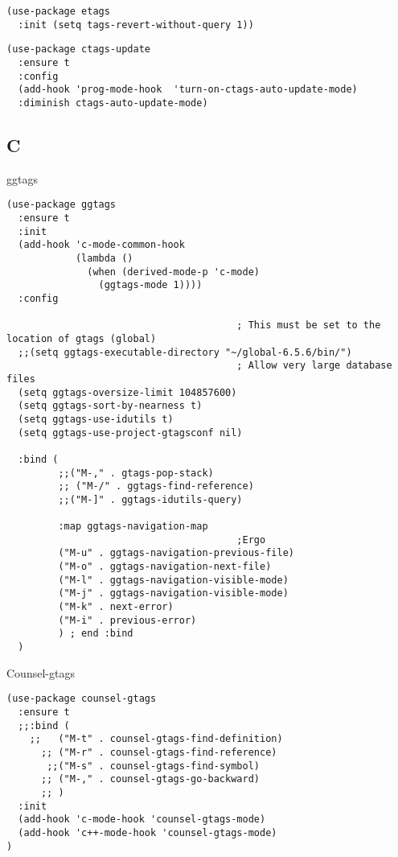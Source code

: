 \documentclass[12pt]{article}
\begin{document}
\lstset{language=example,label= ,caption= ,captionpos=b,numbers=none}
\begin{lstlisting}
(use-package etags
  :init (setq tags-revert-without-query 1))
\end{lstlisting}

\lstset{language=example,label= ,caption= ,captionpos=b,numbers=none}
\begin{lstlisting}
(use-package ctags-update
  :ensure t
  :config
  (add-hook 'prog-mode-hook  'turn-on-ctags-auto-update-mode)
  :diminish ctags-auto-update-mode)
\end{lstlisting}



\subsection{C}
\label{sec:orgb9423d5}
ggtags

\lstset{language=Lisp,label= ,caption= ,captionpos=b,numbers=none}
\begin{lstlisting}
(use-package ggtags
  :ensure t
  :init
  (add-hook 'c-mode-common-hook
            (lambda ()
              (when (derived-mode-p 'c-mode)
                (ggtags-mode 1))))
  :config

                                        ; This must be set to the location of gtags (global)
  ;;(setq ggtags-executable-directory "~/global-6.5.6/bin/")
                                        ; Allow very large database files
  (setq ggtags-oversize-limit 104857600)
  (setq ggtags-sort-by-nearness t)
  (setq ggtags-use-idutils t)
  (setq ggtags-use-project-gtagsconf nil)

  :bind (
         ;;("M-," . gtags-pop-stack)
         ;; ("M-/" . ggtags-find-reference)
         ;;("M-]" . ggtags-idutils-query)

         :map ggtags-navigation-map
                                        ;Ergo
         ("M-u" . ggtags-navigation-previous-file)
         ("M-o" . ggtags-navigation-next-file)
         ("M-l" . ggtags-navigation-visible-mode)
         ("M-j" . ggtags-navigation-visible-mode)
         ("M-k" . next-error)
         ("M-i" . previous-error)
         ) ; end :bind
  )

\end{lstlisting}

Counsel-gtags

\lstset{language=Lisp,label= ,caption= ,captionpos=b,numbers=none}
\begin{lstlisting}
(use-package counsel-gtags
  :ensure t
  ;;:bind (
    ;;   ("M-t" . counsel-gtags-find-definition)
      ;; ("M-r" . counsel-gtags-find-reference)
       ;;("M-s" . counsel-gtags-find-symbol)
      ;; ("M-," . counsel-gtags-go-backward)
      ;; )
  :init 
  (add-hook 'c-mode-hook 'counsel-gtags-mode)
  (add-hook 'c++-mode-hook 'counsel-gtags-mode)
)

\end{lstlisting}
\end{document}
